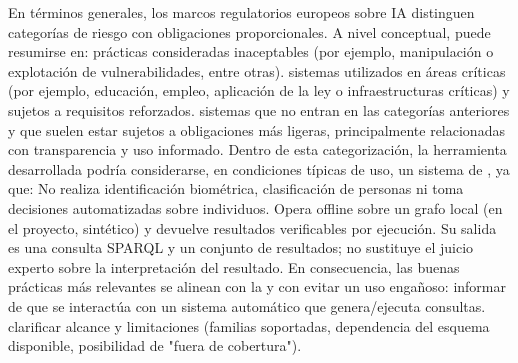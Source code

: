 {}En términos generales, los marcos regulatorios europeos sobre IA distinguen categorías de riesgo con obligaciones proporcionales. A nivel conceptual, puede resumirse en:\markdownRendererInterblockSeparator
{}\markdownRendererUlBegin
\markdownRendererUlItem {} prácticas consideradas inaceptables (por ejemplo, manipulación o explotación de vulnerabilidades, entre otras).\markdownRendererUlItemEnd 
\markdownRendererUlItem {} sistemas utilizados en áreas críticas (por ejemplo, educación, empleo, aplicación de la ley o infraestructuras críticas) y sujetos a requisitos reforzados.\markdownRendererUlItemEnd 
\markdownRendererUlItem {} sistemas que no entran en las categorías anteriores y que suelen estar sujetos a obligaciones más ligeras, principalmente relacionadas con transparencia y uso informado.\markdownRendererUlItemEnd 
\markdownRendererUlEnd \markdownRendererInterblockSeparator
{}\markdownRendererInterblockSeparator
{}Dentro de esta categorización, la herramienta desarrollada podría considerarse, en condiciones típicas de uso, un sistema de , ya que:\markdownRendererInterblockSeparator
{}\markdownRendererUlBeginTight
\markdownRendererUlItem No realiza identificación biométrica, clasificación de personas ni toma decisiones automatizadas sobre individuos.\markdownRendererUlItemEnd 
\markdownRendererUlItem Opera offline sobre un grafo local (en el proyecto, sintético) y devuelve resultados verificables por ejecución.\markdownRendererUlItemEnd 
\markdownRendererUlItem Su salida es una consulta SPARQL y un conjunto de resultados; no sustituye el juicio experto sobre la interpretación del resultado.\markdownRendererUlItemEnd 
\markdownRendererUlEndTight \markdownRendererInterblockSeparator
{}En consecuencia, las buenas prácticas más relevantes se alinean con la  y con evitar un uso engañoso:\markdownRendererInterblockSeparator
{}\markdownRendererUlBeginTight
\markdownRendererUlItem {} informar de que se interactúa con un sistema automático que genera/ejecuta consultas.\markdownRendererUlItemEnd 
\markdownRendererUlItem {} clarificar alcance y limitaciones (familias soportadas, dependencia del esquema disponible, posibilidad de "fuera de cobertura").\markdownRendererUlItemEnd 
